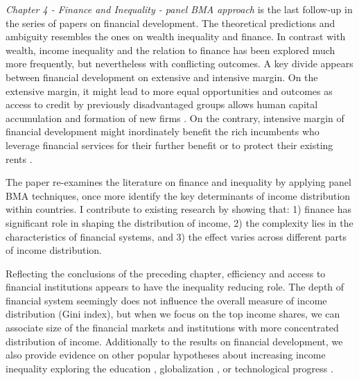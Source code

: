 \begin{refsection}
\emph{Chapter 4 - Finance and Inequality - panel BMA approach} is the last follow-up in the series of papers on financial development. The theoretical predictions and ambiguity resembles the ones on wealth inequality and finance. In contrast with wealth, income inequality and the relation to finance has been explored much more frequently, but nevertheless with conflicting outcomes. A key divide appears between financial development on extensive and intensive margin. On the extensive margin, it might lead to more equal opportunities and outcomes as access to credit by previously disadvantaged groups allows human capital accumulation \parencite{braunetal2019,galormoav2004} and formation of new firms \parencite{banerjeenewman1990,evans1989estimated}. On the contrary, intensive margin of financial development might inordinately benefit the rich incumbents who leverage financial services for their further benefit or to protect their existing rents \parencite{GreenwoodJovanovic1990,perotti2007investor}.

The paper re-examines the literature on finance and inequality by applying panel \ac{BMA} techniques, once more identify the key determinants of income distribution within countries. I contribute to existing research by showing that: 1) finance has significant role in shaping the distribution of income, 2) the complexity lies in the characteristics of financial systems, and 3) the effect varies across different parts of income distribution. 

Reflecting the conclusions of the preceding chapter, efficiency and access to financial institutions appears to have the inequality reducing role. The depth of financial system seemingly does not influence the overall measure of income distribution (Gini index), but when we focus on the top income shares, we can associate size of the financial markets and institutions with more concentrated distribution of income. Additionally to the results on financial development, we also provide evidence on other popular hypotheses about increasing income inequality exploring the education \parencite{goldin2009race}, globalization \parencite{Jaumotte2013}, or technological progress \parencite{dabla2015causes}.





\newpage
\printbibliography[heading=subbibliography]
\end{refsection}